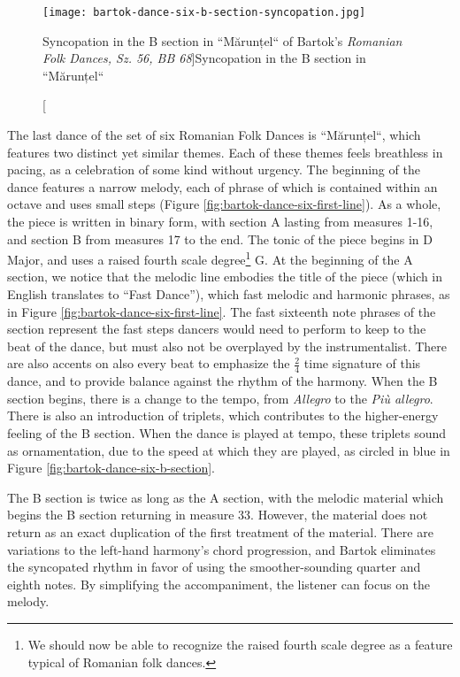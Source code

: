 \begin{figure}
  \centering
  \texttt{[image: bartok-dance-six-b-section-syncopation.jpg]}
  \caption[Syncopation in the B section in ``Mărunțel`` of Bartok's \textit{Romanian Folk Dances, Sz. 56, BB 68}]{Syncopation in the B section in ``Mărunțel``}
  \label{fig:bartok-dance-six-b-section-syncopation}
\end{figure}


The last dance of the set of six Romanian Folk Dances is ``Mărunțel``, which features two distinct yet similar themes. Each of these themes feels breathless in pacing, as a celebration of some kind without urgency. The beginning of the dance features a narrow melody, each of phrase of which is contained within an octave and uses small steps (Figure \ref{fig:bartok-dance-six-first-line}\autocite{Lung_2016}). As a whole, the piece is written in binary form, with section A lasting from measures 1-16, and section B from measures 17 to the end. The tonic of the piece begins in D Major, and uses a raised fourth scale degree\footnote{We should now be able to recognize the raised fourth scale degree as a feature typical of Romanian folk dances.} G\musSharp{}. At the beginning of the A section, we notice that the melodic line embodies the title of the piece (which in English translates to ``Fast Dance''), which fast melodic and harmonic phrases, as in Figure \ref{fig:bartok-dance-six-first-line}\autocite{Lung_2016}. The fast sixteenth note phrases of the section represent the fast steps dancers would need to perform to keep to the beat of the dance, but must also not be overplayed by the instrumentalist. There are also accents on also every beat to emphasize the $\frac{2}{4}$ time signature of this dance, and to provide balance against the rhythm of the harmony. When the B section begins, there is a change to the tempo, from \textit{Allegro} to the \textit{Più allegro}. There is also an introduction of triplets, which contributes to the higher-energy feeling of the B section. When the dance is played at tempo, these triplets sound as ornamentation, due to the speed at which they are played, as circled in blue in Figure \ref{fig:bartok-dance-six-b-section}\autocite{Lung_2016}. 

The B section is twice as long as the A section, with the melodic material which begins the B section returning in measure 33. However, the material does not return as an exact duplication of the first treatment of the material. There are variations to the left-hand harmony's chord progression, and Bartok eliminates the syncopated rhythm in favor of using the smoother-sounding quarter and eighth notes. By simplifying the accompaniment, the listener can focus on the melody.

